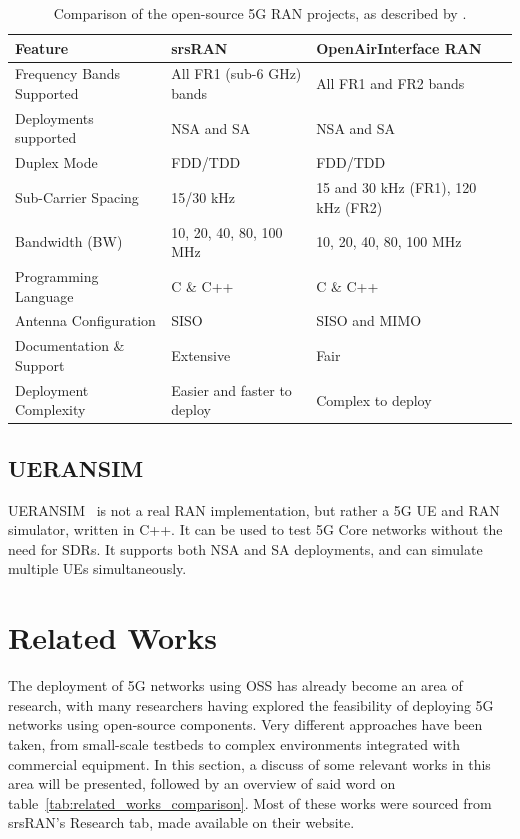 \begin{table}[htbp]
\centering
\footnotesize
\renewcommand{\arraystretch}{1.5}
\begin{tabularx}{\textwidth}{|l|X|X|}
\hline
\rowcolor{gray!30} 
\textbf{Feature} & \textbf{srsRAN} & \textbf{OpenAirInterface \gls{RAN}} \\ \hline
Frequency Bands Supported & All FR1 (sub-6 GHz) bands & All FR1 and FR2 bands \\ \hline
Deployments supported & NSA and SA & NSA and SA \\ \hline
Duplex Mode & FDD/TDD & FDD/TDD \\ \hline
Sub-Carrier Spacing & 15/30 kHz & 15 and 30 kHz (FR1), 120 kHz (FR2) \\ \hline
Bandwidth (BW) & 10, 20, 40, 80, 100 MHz & 10, 20, 40, 80, 100 MHz \\ \hline
Programming Language & C \& C++ & C \& C++ \\ \hline
Antenna Configuration & SISO & SISO and MIMO \\ \hline
Documentation \& Support & Extensive & Fair \\ \hline
Deployment Complexity & Easier and faster to deploy & Complex to deploy \\ \hline
\end{tabularx}
\caption{Comparison of the open-source 5G RAN projects, as described by \textcite{mamushiane2023deploying}.}
\label{tab:5gran_implementations}
\end{table}

\subsection{UERANSIM}
\label{sec:ueransim}

UERANSIM~\cite{ueransim_repo} is not a real \gls{RAN} implementation, but rather a 5G \gls{UE} and \gls{RAN} simulator, written in C++. It can be used to test 5G Core networks without the need for \glspl{SDR}. It supports both \gls{NSA} and \gls{SA} deployments, and can simulate multiple \glspl{UE} simultaneously. 

\section{Related Works}
\label{sec:related_works}
The deployment of 5G networks using \gls{OSS} has already become an area of research, with many researchers having explored the feasibility of deploying 5G networks using open-source components. Very different approaches have been taken, from small-scale testbeds to complex environments integrated with commercial equipment. In this section, a discuss of some relevant works in this area will be presented, followed by an overview of said word on table~\ref{tab:related_works_comparison}. Most of these works were sourced from srsRAN's Research tab, made available on their website.\bigskip

